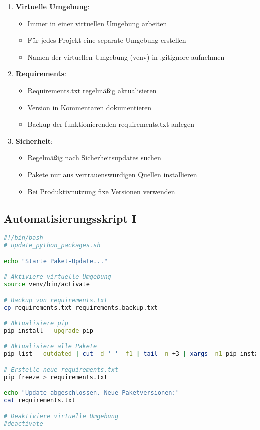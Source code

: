 \documentclass{vorlage-design-main}
\begin{document}
\begin{enumerate}
\def\labelenumi{\arabic{enumi}.}

\item
  \textbf{Virtuelle Umgebung}:

  \begin{itemize}

  \item
    Immer in einer virtuellen Umgebung arbeiten
  \item
    Für jedes Projekt eine separate Umgebung erstellen
  \item
    Namen der virtuellen Umgebung (venv) in .gitignore aufnehmen
  \end{itemize}
\item
  \textbf{Requirements}:

  \begin{itemize}

  \item
    Requirements.txt regelmäßig aktualisieren
  \item
    Version in Kommentaren dokumentieren
  \item
    Backup der funktionierenden requirements.txt anlegen
  \end{itemize}
\item
  \textbf{Sicherheit}:

  \begin{itemize}

  \item
    Regelmäßig nach Sicherheitsupdates suchen
  \item
    Pakete nur aus vertrauenswürdigen Quellen installieren
  \item
    Bei Produktivnutzung fixe Versionen verwenden
  \end{itemize}
\end{enumerate}

\newpage

\subsection{Automatisierungsskript I}\label{automatisierungsskript-i}

\begin{lstlisting}[language=bash]
#!/bin/bash
# update_python_packages.sh

echo "Starte Paket-Update..."

# Aktiviere virtuelle Umgebung
source venv/bin/activate

# Backup von requirements.txt
cp requirements.txt requirements.backup.txt

# Aktualisiere pip
pip install --upgrade pip

# Aktualisiere alle Pakete
pip list --outdated | cut -d ' ' -f1 | tail -n +3 | xargs -n1 pip install -U

# Erstelle neue requirements.txt
pip freeze > requirements.txt

echo "Update abgeschlossen. Neue Paketversionen:"
cat requirements.txt

# Deaktiviere virtuelle Umgebung
#deactivate
\end{lstlisting}
\end{document}
